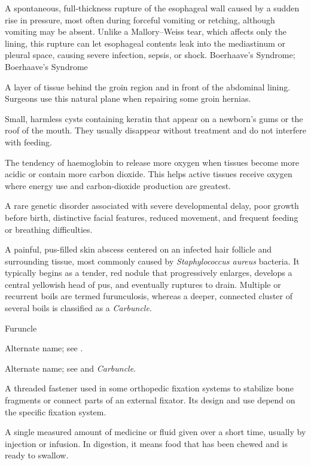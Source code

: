  A spontaneous, full-thickness rupture of the esophageal wall caused by a sudden rise in pressure, most often during forceful vomiting or retching, although vomiting may be absent. Unlike a Mallory--Weiss tear, which affects only the lining, this rupture can let esophageal contents leak into the mediastinum or pleural space, causing severe infection, sepsis, or shock.
\synonyms
Boerhaave's Syndrome; Boerhaave’s Syndrome

 A layer of tissue behind the groin region and in front of the abdominal lining. Surgeons use this natural plane when repairing some groin hernias.

 Small, harmless cysts containing keratin that appear on a newborn's gums or the roof of the mouth. They usually disappear without treatment and do not interfere with feeding.

 The tendency of haemoglobin to release more oxygen when tissues become more acidic or contain more carbon dioxide. This helps active tissues receive oxygen where energy use and carbon-dioxide production are greatest.

 A rare genetic disorder associated with severe developmental delay, poor growth before birth, distinctive facial features, reduced movement, and frequent feeding or breathing difficulties.

 A painful, pus-filled skin abscess centered on an infected hair follicle and surrounding tissue, most commonly caused by \textit{Staphylococcus aureus} bacteria. It typically begins as a tender, red nodule that progressively enlarges, develops a central yellowish head of pus, and eventually ruptures to drain. Multiple or recurrent boils are termed furunculosis, whereas a deeper, connected cluster of several boils is classified as a \textit{Carbuncle}.

\synonyms
Furuncle

 Alternate name; see .

 Alternate name; see  and \textit{Carbuncle}.

 A threaded fastener used in some orthopedic fixation systems to stabilize bone fragments or connect parts of an external fixator. Its design and use depend on the specific fixation system.

 A single measured amount of medicine or fluid given over a short time, usually by injection or infusion. In digestion, it means food that has been chewed and is ready to swallow.

